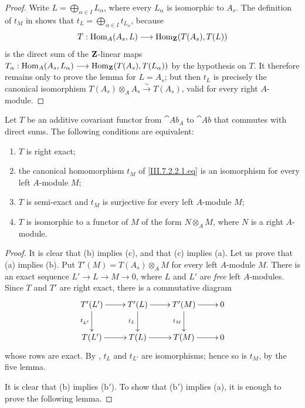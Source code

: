 \begin{proof}
Write $L=\bigoplus_{\alpha\in I}L_\alpha$,
where every $L_\alpha$ is isomorphic to $A_s$.  The definition
of $t_M$ in  shows that $t_L=\bigoplus_{\alpha\in I}t_{L_\alpha}$,
because
\[
  T:
  \operatorname{Hom}_A(A_s,L)
  \longrightarrow
  \operatorname{Hom}_{\mathbf{Z}}(T(A_s),T(L))
\]
is the direct sum of the $\mathbf{Z}$-linear maps $T_\alpha:
\operatorname{Hom}_A(A_s,L_\alpha)
\longrightarrow
\operatorname{Hom}_{\mathbf{Z}}(T(A_s),T(L_\alpha))$
by the hypothesis on $T$.  It therefore remains only to prove
the lemma for $L=A_s$; but then $t_L$ is precisely the canonical
isomorphism $T(A_s)\otimes_A A_s\xrightarrow{\sim}T(A_s)$,
valid for every right $A$-module.
\end{proof}

\begin{proposition}[7.2.5]
\label{III.7.2.5}
Let $T$ be an additive covariant functor from $\cat{Ab}_A$ to
$\cat{Ab}$ that commutes with direct sums.  The following
conditions are equivalent:
\begin{enumerate}
  \item[(a)] $T$ is right exact;
  \item[(b)] the canonical homomorphism $t_M$ of
    \eqref{III.7.2.2.1.eq} is an isomorphism for every left
    $A$-module $M$;
  \item[($\mathrm{b}'$)] $T$ is semi-exact and $t_M$ is
    surjective for every left $A$-module $M$;
  \item[(c)] $T$ is isomorphic to a functor of $M$ of the form
    $N\otimes_A M$, where $N$ is a right $A$-module.
\end{enumerate}
\end{proposition}

\begin{proof}
It is clear that (b) implies (c), and that (c) implies (a).
Let us prove that (a) implies (b).
Put $T'(M)=T(A_s)\otimes_A M$
for every left $A$-module $M$.  There is an exact sequence $L'\longrightarrow L\longrightarrow M\longrightarrow0$,
where $L$ and $L'$ are \emph{free} left $A$-modules.  Since $T$ and
$T'$ are right exact, there is a commutative diagram
\[
\xymatrix{
  T'(L')\ar[r]\ar[d]_{t_{L'}}
  & T'(L)\ar[r]\ar[d]_{t_L}
  & T'(M)\ar[r]\ar[d]_{t_M}
  & 0
  \\
  T(L')\ar[r]
  & T(L)\ar[r]
  & T(M)\ar[r]
  & 0
}
\]
whose rows are exact.  By , $t_L$ and
$t_{L'}$ are isomorphisms; hence so is $t_M$, by the five
lemma.

It is clear that (b) implies ($\mathrm{b}'$).  To show that
($\mathrm{b}'$) implies (a), it is enough to prove the following
lemma.
\end{proof}

